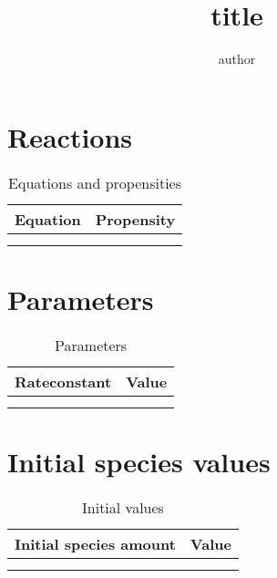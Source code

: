 \documentclass[11pt]{article}
\begin{document}
\title{
{{title}}
}
\author{
{{author}}
}
\maketitle

\section{Reactions}

\begin{table}
    \centering
    \begin{tabular}{l|r}
    Equation & Propensity \\
    \hline
    {%
        {%
            {{cell}}
            {%
               &
            {%
        {%
        \\
    {%
    \hline
    \end{tabular}
    \caption{Equations and propensities}
    \label{tab:equations}
\end{table}

\section{Parameters}

\begin{table}
    \centering
    \begin{tabular}{r|l}
    Rateconstant & Value \\
    \hline
    {%
        {%
            $ 
            {{cell}} 
            $
            {%
               &
            {%
        {%
        \\
    {%
    \hline
    \end{tabular}
    \caption{Parameters}
    \label{tab:rates}
\end{table}

\section{Initial species values}

\begin{table}
    \centering
    \begin{tabular}{r|l}
    Initial species amount & Value \\
    \hline
    {%
        {%
            $ 
            {{cell}} 
            $
            {%
               &
            {%
        {%
        \\
    {%
    \hline
    \end{tabular}
    \caption{Initial values}
    \label{tab:initialvalues}
\end{table}
\end{document}
